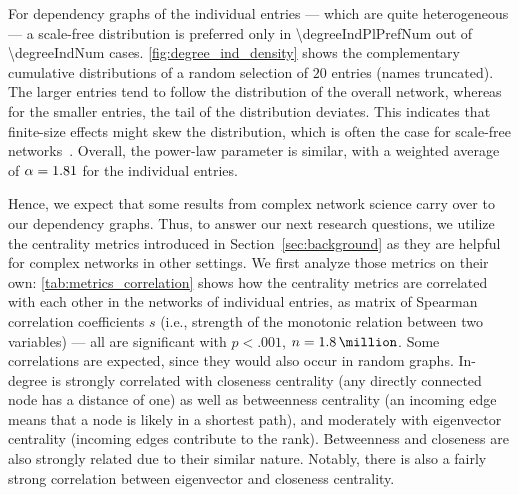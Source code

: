 
For dependency graphs of the individual entries
--- which are quite heterogeneous ---
a scale-free distribution is preferred only in \num{\degreeIndPlPrefNum} out of \num{\degreeIndNum} cases.
\autoref{fig:degree_ind_density} shows the complementary cumulative distributions of a random selection of $20$ entries (names truncated).
The larger entries tend to follow the distribution of the overall network,
whereas for the smaller entries, the tail of the distribution deviates.
This indicates that finite-size effects might skew the distribution,
which is often the case for scale-free networks~\cite{FiniteSize2021Serafino}.
Overall, the power-law parameter is similar, with a weighted average of $\alpha=\num[round-mode=places,round-precision=2]{\degreeIndAlpha}$ for the individual entries.

Hence, we expect that some results from complex network science carry over to our dependency graphs.
Thus, to answer our next research questions, we utilize the centrality metrics introduced in Section~\ref{sec:background} as they are helpful for complex networks in other settings.
We first analyze those metrics on their own:
\autoref{tab:metrics_correlation} shows how the centrality metrics are correlated with each other in the networks of individual entries,
as matrix of Spearman correlation coefficients $s$ (i.e., strength of the monotonic relation between two variables) ---
all are significant with $p<.001$, $n=\SI[round-mode=places,round-precision=1]{\metricCorrelationN}{\million}$.
Some correlations are expected, since they would also occur in random graphs.
In-degree is strongly correlated with closeness centrality
(any directly connected node has a distance of one)
as well as betweenness centrality
(an incoming edge means that a node is likely in a shortest path),
and moderately with eigenvector centrality
(incoming edges contribute to the rank).
Betweenness and closeness are also strongly related due to their similar nature.
Notably, there is also a fairly strong correlation between eigenvector and closeness centrality.



